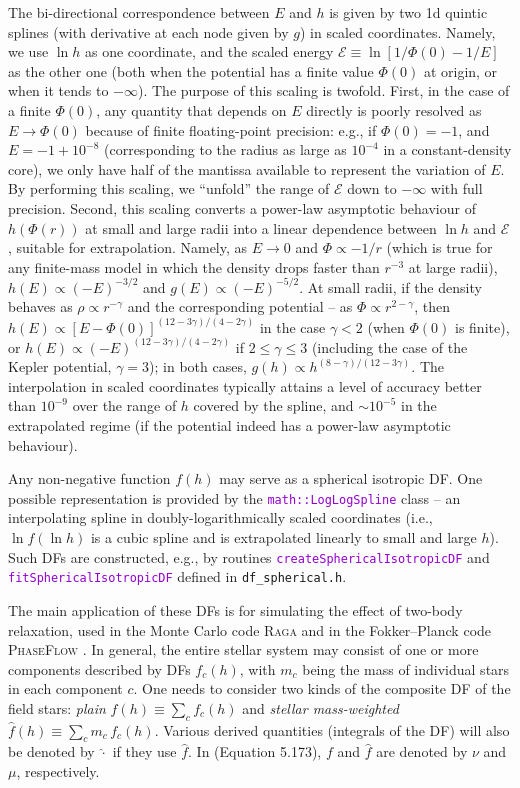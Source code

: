 \documentclass[12pt]{article}
\newcommand{\Raga} {\textsc{Raga}\xspace}
\newcommand{\ttt}[1]{\textcolor{darkviolet}{\texttt{#1}}}
\newcommand{\scE}{\mathscr E}
\begin{document}
The bi-directional correspondence between $E$ and $h$ is given by two 1d quintic splines (with derivative at each node given by $g$) in scaled coordinates. Namely, we use $\ln h$ as one coordinate, and the scaled energy $\scE \equiv \ln[1/\Phi(0) - 1/E]$ as the other one (both when the potential has a finite value $\Phi(0)$ at origin, or when it tends to $-\infty$). The purpose of this scaling is twofold. First, in the case of a finite $\Phi(0)$, any quantity that depends on $E$ directly is poorly resolved as $E\to \Phi(0)$ because of finite floating-point precision: e.g., if $\Phi(0)=-1$, and $E=-1+10^{-8}$ (corresponding to the radius as large as $10^{-4}$ in a constant-density core), we only have half of the mantissa available to represent the variation of $E$. By performing this scaling, we ``unfold'' the range of $\scE$ down to $-\infty$ with full precision. Second, this scaling converts a power-law asymptotic behaviour of $h(\Phi(r))$ at small and large radii into a linear dependence between $\ln h$ and $\scE$, suitable for extrapolation. Namely, as $E \to 0$ and $\Phi \propto -1/r$ (which is true for any finite-mass model in which the density drops faster than $r^{-3}$ at large radii), $h(E)\propto (-E)^{-3/2}$ and $g(E)\propto (-E)^{-5/2}$. At small radii, if the density behaves as $\rho \propto r^{-\gamma}$ and the corresponding potential -- as $\Phi \propto r^{2-\gamma}$, then $h(E) \propto [E-\Phi(0)]^{(12-3\gamma)/(4-2\gamma)}$ in the case $\gamma<2$ (when $\Phi(0)$ is finite), or $h(E) \propto (-E)^{(12-3\gamma)/(4-2\gamma)}$ if $2\le \gamma \le 3$ (including the case of the Kepler potential, $\gamma=3$); in both cases, $g(h) \propto h^{(8-\gamma)/(12-3\gamma)}$.
The interpolation in scaled coordinates typically attains a level of accuracy better than $10^{-9}$ over the range of $h$ covered by the spline, and $\sim 10^{-5}$ in the extrapolated regime (if the potential indeed has a power-law asymptotic behaviour).

Any non-negative function $f(h)$ may serve as a spherical isotropic DF. One possible representation is provided by the \ttt{math::LogLogSpline} class -- an interpolating spline in doubly-logarithmically scaled coordinates (i.e., $\ln f (\ln h)$ is a cubic spline and is extrapolated linearly to small and large $h$). Such DFs are constructed, e.g., by routines \ttt{createSphericalIsotropicDF} and \ttt{fitSphericalIsotropicDF} defined in \texttt{df_spherical.h}.

The main application of these DFs is for simulating the effect of two-body relaxation, used in the Monte Carlo code \Raga \cite{Vasiliev2015} and in the Fokker--Planck code \textsc{PhaseFlow} \cite{Vasiliev2017}. In general, the entire stellar system may consist of one or more components described by DFs $f_c(h)$, with $m_c$ being the mass of individual stars in each component $c$. One needs to consider two kinds of the composite DF of the field stars: \textsl{plain} $f(h) \equiv \sum_{c} f_c(h)$ and \textsl{stellar mass-weighted} $\widehat f(h) \equiv \sum_{c} m_c\,f_c(h)$. Various derived quantities (integrals of the DF) will also be denoted by $\widehat{\cdot}$ if they use $\widehat f$. In \cite{Merritt2013} (Equation 5.173), $f$ and $\widehat f$ are denoted by $\nu$ and $\mu$, respectively.
\end{document}
